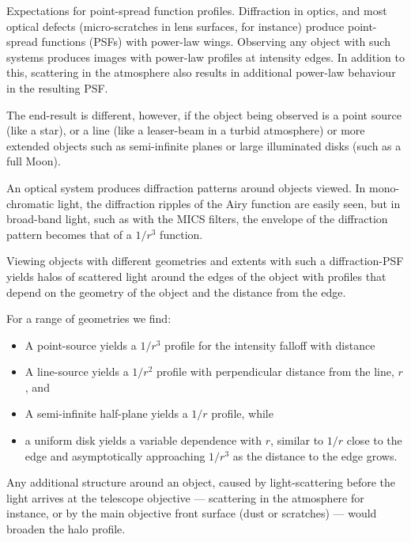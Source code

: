 \documentclass[final,hyperref={pdfpagelabels=false}]{beamer}
\begin{document}
\begin{frame}[t]
\begin{columns}[t]
\begin{column}{.23\textwidth}
\begin{block}
\end{block}

\begin{block}{Expectations for point-spread function profiles.}
Diffraction in optics, and most optical defects (micro-scratches in lens surfaces, for instance) produce point-spread functions (PSFs) with power-law wings. Observing any object with such systems produces images with power-law profiles at intensity edges. In addition to this, scattering in the atmosphere also results in additional power-law behaviour in the resulting PSF. 

The end-result is different, however, if the object being observed is a point source (like a star), or a line (like a leaser-beam in a turbid atmosphere) or more extended objects such as semi-infinite planes or large illuminated disks (such as a full Moon).

An optical system produces diffraction patterns around objects viewed. In mono-chromatic light, the diffraction ripples of the Airy function are easily seen, but in broad-band light, such as with the MICS filters, the envelope of the diffraction pattern becomes that of a $1/r^3$ function.

Viewing objects with different geometries and extents with such a diffraction-PSF yields halos of scattered light around the edges of the object with profiles that depend on the geometry of the object and the distance from the edge.

For a range of geometries we find:
\begin{itemize}
    \item A point-source yields a $1/r^3$ profile for the intensity falloff with distance
    \item A line-source yields a $1/r^2$ profile with perpendicular distance from the line, $r$, and
    \item A semi-infinite half-plane yields a $1/r$ profile, while
    \item a uniform disk yields a variable dependence with $r$, similar to $1/r$ close to the edge and asymptotically approaching $1/r^3$ as the distance to the edge grows.
\end{itemize}

Any additional structure around an object, caused by light-scattering before the light arrives at the telescope objective --- scattering in  the atmosphere for instance, or by the main objective front surface (dust or scratches) --- would broaden the halo profile.


\end{block}
\end{column}
\end{columns}
\end{frame}
\end{document}
